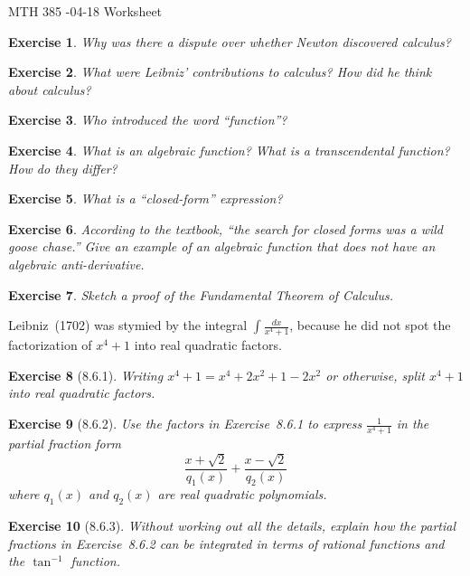 \documentclass[12pt]{article}
\theoremstyle{plain}
\newtheorem{ex}{Exercise}
\begin{document}
MTH 385 -04-18 Worksheet

\begin{ex}
  Why was there a dispute over whether Newton discovered calculus?
\end{ex}

\begin{ex}
  What were Leibniz' contributions to calculus? How did he think about calculus?
\end{ex}

\begin{ex}
  Who introduced the word ``function''?
\end{ex}

\begin{ex}
  What is an algebraic function? What is a transcendental function? How do they differ?
\end{ex}

\begin{ex}
  What is a ``closed-form'' expression?
\end{ex}

\begin{ex}
  According to the textbook, ``the search for closed forms was a wild goose chase.'' Give an example of an algebraic function that does not have an algebraic anti-derivative.
\end{ex}

\begin{ex}
  Sketch a proof of the Fundamental Theorem  of Calculus.
\end{ex}

Leibniz~(1702) was stymied by the integral $\int\frac{dx}{x^4+1}$, because he did not spot the factorization of $x^4+1$ into real quadratic factors.

\begin{ex} [8.6.1]
  Writing $x^4+1=x^4+2x^2+1-2x^2$ or otherwise, split $x^4+1$ into real quadratic factors.
\end{ex}

\begin{ex} [8.6.2]
  Use the factors in Exercise~8.6.1 to express $\frac{1}{x^4+1}$ in the partial fraction form
  \[
    \frac{x+\sqrt{2}}{q_1(x)}+\frac{x-\sqrt{2}}{q_2(x)}
  \]
  where $q_1(x)$ and $q_2(x)$ are real quadratic polynomials.
\end{ex}

\begin{ex} [8.6.3]
  Without working out all the details, explain how the partial fractions in Exercise~8.6.2 can be integrated in terms of rational functions and the $\tan^{-1}$ function.
\end{ex}
\end{document}
